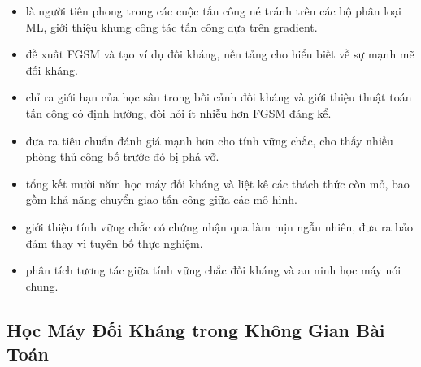 \documentclass[12pt,a4paper]{report}
\begin{document}
\begin{itemize}
  \item \citet{biggio2013evasion} là người tiên phong trong các cuộc tấn công né tránh trên các bộ phân loại ML, giới thiệu khung công tác tấn công dựa trên gradient.
  
  \item \citet{goodfellow2014explaining} đề xuất FGSM và tạo ví dụ đối kháng, nền tảng cho hiểu biết về sự mạnh mẽ đối kháng.
  
  \item \citet{papernot2016limits} chỉ ra giới hạn của học sâu trong bối cảnh đối kháng và giới thiệu thuật toán tấn công có định hướng, đòi hỏi ít nhiễu hơn FGSM đáng kể.
  
  \item \citet{carlini2016towards} đưa ra tiêu chuẩn đánh giá mạnh hơn cho tính vững chắc, cho thấy nhiều phòng thủ công bố trước đó bị phá vỡ.
  
  \item \citet{roli2018wild} tổng kết mười năm học máy đối kháng và liệt kê các thách thức còn mở, bao gồm khả năng chuyển giao tấn công giữa các mô hình.
  
  \item \citet{carlini2019certified} giới thiệu tính vững chắc có chứng nhận qua làm mịn ngẫu nhiên, đưa ra bảo đảm thay vì tuyên bố thực nghiệm.
  
  \item \citet{bruckner2021machine} phân tích tương tác giữa tính vững chắc đối kháng và an ninh học máy nói chung.
\end{itemize}

\subsection{Học Máy Đối Kháng trong Không Gian Bài Toán}
\end{document}
